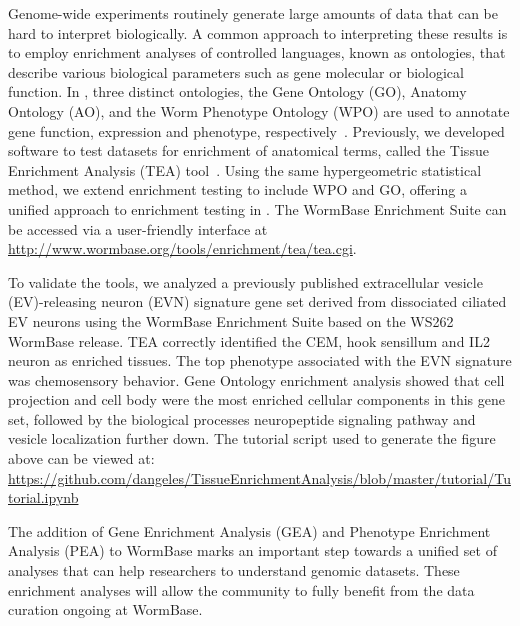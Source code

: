Genome-wide experiments routinely generate large amounts of data that can be
hard to interpret biologically. A common approach to interpreting these results
is to employ enrichment analyses of controlled languages, known as ontologies,
that describe various biological parameters such as gene molecular or biological
function. In \cel{}, three distinct ontologies, the Gene Ontology (GO),
Anatomy Ontology (AO), and the Worm Phenotype Ontology (WPO) are used to
annotate gene function, expression and phenotype,
respectively~\citep{TheGeneOntologyConsortium2000a,Lee2003,Schindelman2011}.
Previously, we developed software to test datasets for enrichment of anatomical
terms, called the Tissue Enrichment Analysis (TEA)
tool~\citep{Angeles-Albores2016}. Using the same hypergeometric statistical
method, we extend enrichment testing to include WPO and GO, offering a unified
approach to enrichment testing in \cel{}. The WormBase Enrichment Suite can
be accessed via a user-friendly interface at
\url{http://www.wormbase.org/tools/enrichment/tea/tea.cgi}.

To validate the tools, we analyzed a previously published extracellular vesicle
(EV)-releasing neuron (EVN) signature gene set derived from dissociated ciliated
EV neurons\citep{Wang2015} using the WormBase Enrichment Suite based on the
WS262 WormBase release. TEA correctly identified the CEM, hook sensillum and IL2
neuron as enriched tissues. The top phenotype associated with the EVN signature
was chemosensory behavior. Gene Ontology enrichment analysis showed that cell
projection and cell body were the most enriched cellular components in this gene
set, followed by the biological processes neuropeptide signaling pathway and
vesicle localization further down. The tutorial script used to generate the
figure above can be viewed at:
\url{https://github.com/dangeles/TissueEnrichmentAnalysis/blob/master/tutorial/Tutorial.ipynb}

The addition of Gene Enrichment Analysis (GEA) and Phenotype Enrichment Analysis
(PEA) to WormBase marks an important step towards a unified set of analyses that
can help researchers to understand genomic datasets. These enrichment analyses
will allow the community to fully benefit from the data curation ongoing at
WormBase.


